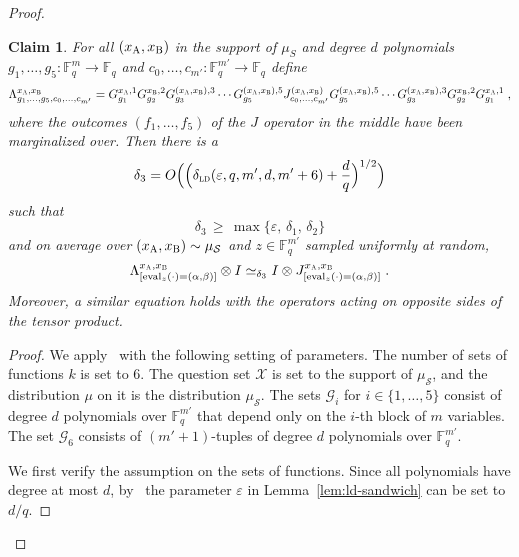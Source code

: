 \documentclass[11pt]{article}
\newtheorem{claim}[theorem]{Claim}
\theoremstyle{definition}
\newcommand{\F}{\ensuremath{\mathbb{F}}}
\newcommand{\ot}{\otimes}
\newcommand{\ld}{\textsc{ld}}
\newcommand{\eps}{\varepsilon}
\newcommand{\sampler}{\mathcal{S}}
\newcommand{\labelstyle}[1]{\ensuremath{\textsc{#1}}\xspace}
\newcommand{\alice}{\labelstyle{A}}
\newcommand{\bob}{\labelstyle{B}}
\newcommand{\eval}{\mathrm{eval}}
\begin{document}
\begin{proof}
	\begin{claim}\label{claim:ar-5}
    For all $(x_\alice,x_\bob)$ in the support of $\mu_S$ and degree $d$
    polynomials $g_1,\ldots,g_5:\F_q^m\to \F_q$ and $c_0,\ldots,c_{m'}:\F_q^{m'}
    \to \F_q$ define
    \begin{equation}
      \Lambda^{{x}_\alice, {x}_\bob}_{ g_1, \dots, g_5, c_0, \dots, c_{m'}} =
      G^{{x}_\alice, 1}_{g_1} G^{{x}_\bob, 2}_{g_2} G^{({x}_\alice, {x}_\bob),
        3}_{g_3} \cdots G^{({x}_\alice, {x}_\bob),5}_{g_5} J^{({x}_\alice, {x}_\bob)}_{c_0,
        \dots, c_{m'}} G^{({x}_\alice, {x}_\bob), 5}_{g_5}
      \cdots
      G^{({x}_\alice, {x}_\bob), 3}_{g_3} G^{x_\bob,2}_{g_2} G^{{x}_\alice,1}_{g_1}\;,
      \label{eq:lambda-giant-sandwich}
    \end{equation}
    where the outcomes $(f_1,\ldots,f_5)$ of the $J$ operator in the middle have
    been marginalized over.
    Then there is a
    \[\delta_3 = O\Big(\Big(\delta_{\ld}({\eps}, q, m', d,
      m'+6)+ \frac{d}{q}\Big)^{1/2}\Big)\]
    such that
    \[ \delta_3 \,\geq\, \max\big\{ \eps, \,\delta_1,\,\delta_2\big\}\]
    and on average over $({x}_\alice, {x}_\bob) \sim
    \mu_{\sampler}$ and $z\in \F_q^{m'}$ sampled uniformly at random,
    \begin{equation}
      \Lambda^{{x}_\alice, {x}_\bob}_{[\eval_{z}(\cdot) = ( \alpha, \beta)]} \ot I
      \simeq_{\delta_3} I \ot J^{{x}_\alice, {x}_\bob}_{[\eval_{z}(\cdot)
        = ( \alpha, \beta)]}\;.
    \label{eq:lambda-consistent}
  \end{equation}
	Moreover, a similar equation holds with the operators acting on opposite sides
  of the tensor product.

\end{claim}
	\begin{proof}
    We apply~ with the following setting of parameters.
    The number of sets of functions $k$ is set to $6$.
    The question set $\mathcal{X}$ is set to the support of $\mu_\sampler$, and
    the distribution $\mu$ on it is the distribution $\mu_\sampler$.
    The sets $\mathcal{G}_i$ for $i \in \{1, \dots, 5\}$ consist of degree $d$
    polynomials over $\F_q^{m'}$ that depend only on the $i$-th block of $m$
    variables.
    The set $\mathcal{G}_6$ consists of $(m' + 1)$-tuples of degree $d$
    polynomials over $\F_q^{m'}$.

    We first verify the assumption on the sets of functions.
    Since all polynomials have degree at most $d$, by~
    the parameter $\eps$ in Lemma~\ref{lem:ld-sandwich} can be set to $d/q$.


\end{proof}
\end{proof}
\end{document}
